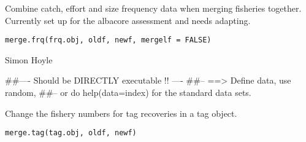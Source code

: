 \documentclass[a4paper]{book}
\begin{document}
%
\begin{Description}\relax

Combine catch, effort and size frequency data when merging fisheries together. Currently set up for the albacore assessment and needs adapting. 
\end{Description}
%
\begin{Usage}
\begin{verbatim}
merge.frq(frq.obj, oldf, newf, mergelf = FALSE)
\end{verbatim}
\end{Usage}
%
\begin{Arguments}
\begin{ldescription}
\item[\code{frq.obj}] 


\item[\code{oldf}] 


\item[\code{newf}] 


\item[\code{mergelf}] 


\end{ldescription}
\end{Arguments}
%
\begin{Author}\relax

Simon Hoyle
\end{Author}
%
\begin{Examples}
\begin{ExampleCode}
##---- Should be DIRECTLY executable !! ----
##-- ==>  Define data, use random,
##--	or do  help(data=index)  for the standard data sets.

\end{ExampleCode}
\end{Examples}
%
\begin{Description}\relax

Change the fishery numbers for tag recoveries in a tag object. 
\end{Description}
%
\begin{Usage}
\begin{verbatim}
merge.tag(tag.obj, oldf, newf)
\end{verbatim}
\end{Usage}
%
\begin{Arguments}
\begin{ldescription}
\item[\code{tag.obj}] 


\item[\code{oldf}] 


\item[\code{newf}] 


\end{ldescription}
\end{Arguments}
\end{document}
